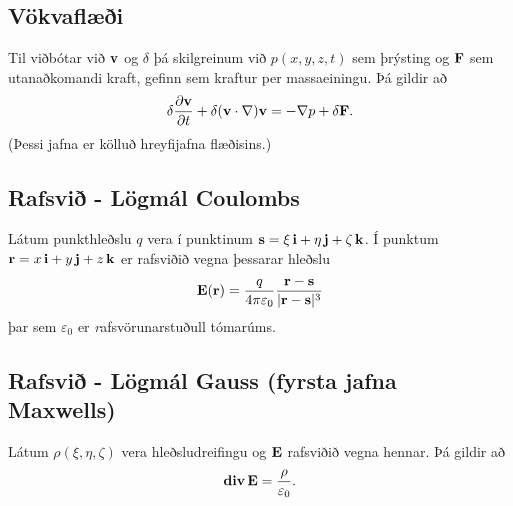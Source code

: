 \documentclass[a4paper,10pt,icelandic]{sphinxmanual}
\begin{document}
\subsection{Vökvaflæði}
\label{Kafli6:id14}
Til viðbótar við \(\mbox{${\bf v}$}\) og \(\delta\) þá
skilgreinum við \(p(x,y,z,t)\) sem þrýsting og
\(\mbox{${\bf F}$}\) sem utanaðkomandi kraft, gefinn sem kraftur per
massaeiningu. Þá gildir að
\begin{gather}
\begin{split}\displaystyle \delta\frac{\partial \mbox{${\bf v}$}}{\partial t}+\delta(\mbox{${\bf v}$}\cdot\nabla)\mbox{${\bf v}$}=-\nabla p+\delta\mbox{${\bf F}$}.\end{split}\notag
\end{gather}
(Þessi jafna er kölluð hreyfijafna flæðisins.)


\subsection{Rafsvið - Lögmál Coulombs}
\label{Kafli6:rafsvi-logmal-coulombs}
Látum punkthleðslu \(q\) vera í punktinum
\(\mbox{${\bf s}$}=\xi\,\mbox{${\bf i}$}+\eta\,\mbox{${\bf j}$}+\zeta\,\mbox{${\bf k}$}\).
Í punktum
\(\mbox{${\bf r}$}=x\,\mbox{${\bf i}$}+y\,\mbox{${\bf j}$}+z\,\mbox{${\bf k}$}\)
er rafsviðið vegna þessarar hleðslu
\begin{gather}
\begin{split}\displaystyle \mbox{${\bf E}$}(\mbox{${\bf r}$})=\frac{q}{4\pi\varepsilon_0}\frac{\mbox{${\bf r}$}-\mbox{${\bf s}$}}{|\mbox{${\bf r}$}-\mbox{${\bf s}$}|^3}\end{split}\notag
\end{gather}
þar sem \(\varepsilon_0\) er \emph{r}afsvörunarstuðull tómarúms.


\subsection{Rafsvið - Lögmál Gauss (fyrsta jafna Maxwells)}
\label{Kafli6:rafsvi-logmal-gauss-fyrsta-jafna-maxwells}
Látum \(\rho(\xi,\eta,\zeta)\) vera hleðsludreifingu og
\(\mbox{${\bf E}$}\) rafsviðið vegna hennar. Þá gildir að
\begin{gather}
\begin{split}\displaystyle \mbox{${\rm\bf div\,}$}\mbox{${\bf E}$}=\frac{\rho}{\varepsilon_0}.\end{split}\notag
\end{gather}
\end{document}
